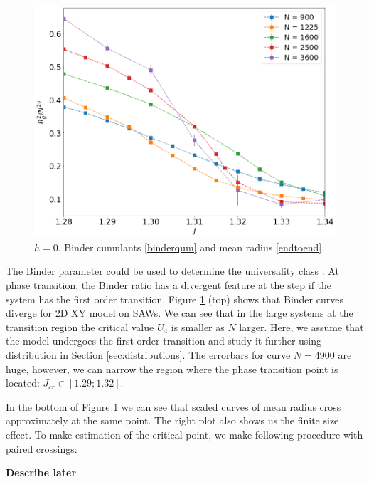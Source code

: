 \begin{figure}[H]
 	\includegraphics[scale=0.23]{Images/rscaling_longchains.png} 	
 	
 	\caption{$h=0$. Binder  cumulants \eqref{binderqum} and mean radius \eqref{endtoend}.  }
 	\label{fig:bcshort}
 \end{figure}

The Binder parameter  could be used to determine the universality class \cite{binder1981finite}.  At phase transition, the Binder ratio  has a divergent feature at the step if the system has the first order transition. Figure \ref{fig:bcshort}  (top) shows that Binder curves diverge for 2D XY model on SAWs. We can see that in the large systems at the transition region the critical value $ U_4  $ is smaller as $N$ larger. Here, we assume that the model undergoes  the first order transition and study it further using distribution in Section \ref{sec:distributions}. The errorbars for curve $N=4900$ are huge, however, we can narrow the region where the phase transition point is located: $J_{cr} \in [1.29; 1.32]$. 

In the bottom of Figure \ref{fig:bcshort} we can see that scaled curves of mean radius cross approximately at the same point. The right plot also shows us the finite size effect. To make estimation of the critical point, we make following procedure with paired crossings: 

\textbf{Describe later}

